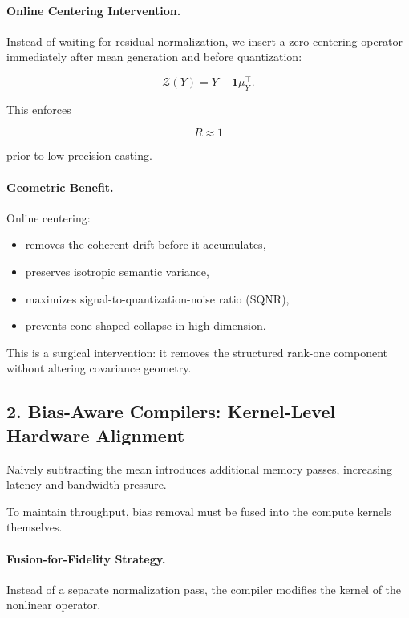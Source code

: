 \paragraph{Online Centering Intervention.}

Instead of waiting for residual normalization,
we insert a zero-centering operator
immediately after mean generation and before quantization:

\[
\mathcal{Z}(Y) = Y - \mathbf{1}\mu_Y^\top.
\]

This enforces

\[
R \approx 1
\]

prior to low-precision casting.

\paragraph{Geometric Benefit.}

Online centering:
\begin{itemize}
\item removes the coherent drift before it accumulates,
\item preserves isotropic semantic variance,
\item maximizes signal-to-quantization-noise ratio (SQNR),
\item prevents cone-shaped collapse in high dimension.
\end{itemize}

This is a surgical intervention:
it removes the structured rank-one component
without altering covariance geometry.

\subsection{2. Bias-Aware Compilers: Kernel-Level Hardware Alignment}
\label{subsec:bias_aware_compiler}

Naively subtracting the mean introduces additional memory passes,
increasing latency and bandwidth pressure.

To maintain throughput,
bias removal must be fused into the compute kernels themselves.

\paragraph{Fusion-for-Fidelity Strategy.}

Instead of a separate normalization pass,
the compiler modifies the kernel of the nonlinear operator.

